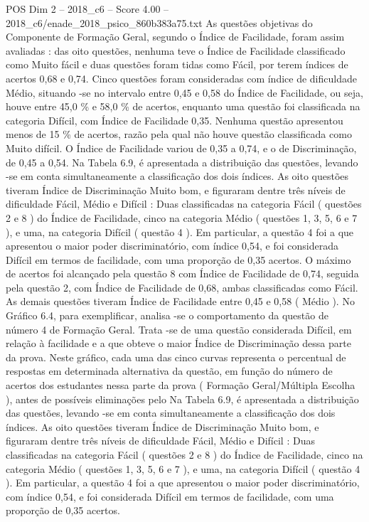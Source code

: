 \begin{textsample}{POS Dim 2 – 2018\_c6 – Score 4.00 – 2018\_c6/enade\_2018\_psico\_860b383a75.txt}
As questões objetivas do Componente de Formação Geral, segundo o Índice de Facilidade, foram assim avaliadas : das oito questões, nenhuma teve o Índice de Facilidade classificado como Muito fácil e duas questões foram tidas como Fácil, por terem índices de acertos 0,68 e 0,74.
Cinco questões foram consideradas com índice de dificuldade Médio, situando -se no intervalo entre 0,45 e 0,58 do Índice de Facilidade, ou seja, houve entre 45,0 \% e 58,0 \% de acertos, enquanto uma questão foi classificada na categoria Difícil, com Índice de Facilidade 0,35.
Nenhuma questão apresentou menos de 15 \% de acertos, razão pela qual não houve questão classificada como Muito difícil.
O Índice de Facilidade variou de 0,35 a 0,74, e o de Discriminação, de 0,45 a 0,54.
Na Tabela 6.9, é apresentada a distribuição das questões, levando -se em conta simultaneamente a classificação dos dois índices.
As oito questões tiveram Índice de Discriminação Muito bom, e figuraram dentre três níveis de dificuldade Fácil, Médio e Difícil : Duas classificadas na categoria Fácil ( questões 2 e 8 ) do Índice de Facilidade, cinco na categoria Médio ( questões 1, 3, 5, 6 e 7 ), e uma, na categoria Difícil ( questão 4 ).
Em particular, a questão 4 foi a que apresentou o maior poder discriminatório, com índice 0,54, e foi considerada Difícil em termos de facilidade, com uma proporção de 0,35 acertos.
O máximo de acertos foi alcançado pela questão 8 com Índice de Facilidade de 0,74, seguida pela questão 2, com Índice de Facilidade de 0,68, ambas classificadas como Fácil.
As demais questões tiveram Índice de Facilidade entre 0,45 e 0,58 ( Médio ).
No Gráfico 6.4, para exemplificar, analisa -se o comportamento da questão de número 4 de Formação Geral.
Trata -se de uma questão considerada Difícil, em relação à facilidade e a que obteve o maior Índice de Discriminação dessa parte da prova.
Neste gráfico, cada uma das cinco curvas representa o percentual de respostas em determinada alternativa da questão, em função do número de acertos dos estudantes nessa parte da prova ( Formação Geral/Múltipla Escolha ), antes de possíveis eliminações pelo Na Tabela 6.9, é apresentada a distribuição das questões, levando -se em conta simultaneamente a classificação dos dois índices.
As oito questões tiveram Índice de Discriminação Muito bom, e figuraram dentre três níveis de dificuldade Fácil, Médio e Difícil : Duas classificadas na categoria Fácil ( questões 2 e 8 ) do Índice de Facilidade, cinco na categoria Médio ( questões 1, 3, 5, 6 e 7 ), e uma, na categoria Difícil ( questão 4 ).
Em particular, a questão 4 foi a que apresentou o maior poder discriminatório, com índice 0,54, e foi considerada Difícil em termos de facilidade, com uma proporção de 0,35 acertos.

\end{textsample}
